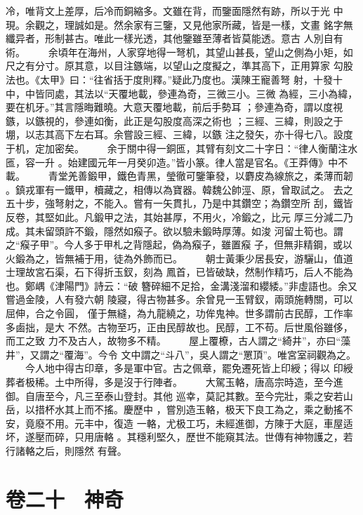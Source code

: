 \documentclass{ctexart}
\begin{document}
冷，唯背文上差厚，后冷而銅縮多。文雖在背，而鑒面隱然有跡，所以于光 中現。余觀之，理誠如是。然余家有三鑒，又見他家所藏，皆是一樣，文畫 銘字無纖异者，形制甚古。唯此一樣光透，其他鑒雖至薄者皆莫能透。意古 人別自有術。 　　余頃年在海州，人家穿地得一弩机，其望山甚長，望山之側為小矩，如 尺之有分寸。原其意，以目注鏃端，以望山之度擬之，準其高下，正用算家 勾股法也。《太甲》曰：``往省括于度則釋。''疑此乃度也。漢陳王寵善弩 射，十發十中，中皆同處，其法以``天覆地載，參連為奇，三微三小。三微 為經，三小為緯，要在机牙。''其言隱晦難曉。大意天覆地載，前后手勢耳 ；參連為奇，謂以度視鏃，以鏃視的，參連如衡，此正是勾股度高深之術也 ；三經、三緯，則設之于堋，以志其高下左右耳。余嘗設三經、三緯，以鏃 注之發矢，亦十得七八。設度于机，定加密矣。 　　余于關中得一銅匜，其臂有刻文二十字日：``律人衡蘭注水匜，容一升 。始建國元年一月癸卯造。''皆小篆。律人當是官名。《王莽傳》中不載。 　　青堂羌善鍛甲，鐵色青黑，瑩徹可鑒筆發，以麝皮為線旅之，柔薄而韌 。鎮戎軍有一鐵甲，櫝藏之，相傳以為寶器。韓魏公帥涇、原，曾取試之。 去之五十步，強弩射之，不能入。嘗有一矢貫扎，乃是中其鑽空；為鑽空所 刮，鐵皆反卷，其堅如此。凡鍛甲之法，其始甚厚，不用火，冷鍛之，比元 厚三分減二乃成。其未留頭許不鍛，隱然如瘊子。欲以驗未鍛時厚薄。如浚 河留土筍也。謂之``瘊子甲''。今人多于甲札之背隱起，偽為瘊子，雖置瘊 子，但無非精鋼，或以火鍛為之，皆無補于用，徒為外飾而已。 　　朝士黃秉少居長安，游驪山，值道士理故宮石渠，石下得折玉釵，刻為 鳳首，已皆破缺，然制作精巧，后人不能為也。鄭嵎《津陽門》詩云：``破 簪碎細不足拾，金溝淺溜和纓緌。''非虛語也。余又嘗過金陵，人有發六朝 陵寢，得古物甚多。余曾見一玉臂釵，兩頭施轉關，可以屈伸，合之令圓， 僅于無縫，為九龍繞之，功侔鬼神。世多謂前古民醇，工作率多鹵拙，是大 不然。古物至巧，正由民醇故也。民醇，工不苟。后世風俗雖侈，而工之致 力不及古人，故物多不精。 　　屋上覆橑，古人謂之``綺井''，亦曰``藻井''，又謂之``覆海''。今令 文中謂之``斗八''，吳人謂之``罳頂''。唯宮室祠觀為之。 　　今人地中得古印章，多是軍中官。古之佩章，罷免遷死皆上印綬；得以 印綬葬者极稀。土中所得，多是沒于行陣者。 　　大駕玉輅，唐高宗時造，至今進御。自唐至今，凡三至泰山登封。其他 巡幸，莫記其數。至今完壯，乘之安若山岳，以措杯水其上而不搖。慶歷中 ，嘗別造玉輅，极天下良工為之，乘之動搖不安，竟廢不用。元丰中，復造 一輅，尤极工巧，未經進御，方陳于大庭，車屋适坏，遂壓而碎，只用唐輅 。其穩利堅久，歷世不能窺其法。世傳有神物護之，若行諸輅之后，則隱然 有聲。
\clearpage
\section{卷二十　神奇}
\end{document}
